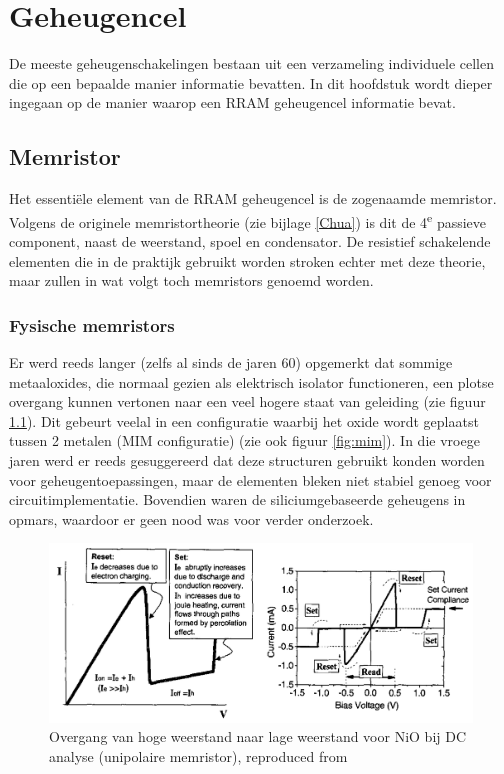 \chapter{Geheugencel}
\label{cell}
De meeste geheugenschakelingen bestaan uit een verzameling individuele cellen die op een bepaalde manier informatie bevatten.
In dit hoofdstuk wordt dieper ingegaan op de manier waarop een RRAM geheugencel informatie bevat.

\section{Memristor}
Het essentiële element van de RRAM geheugencel is de zogenaamde memristor.
Volgens de originele memristortheorie (zie bijlage \ref{Chua}) is dit de 4\textsuperscript{e} passieve component, naast de weerstand, spoel en condensator. De resistief schakelende elementen die in de praktijk gebruikt worden stroken echter met deze theorie, maar zullen in wat volgt toch memristors genoemd worden.

\subsection{Fysische memristors}
Er werd reeds langer (zelfs al sinds de jaren 60) opgemerkt dat sommige metaaloxides, die normaal gezien als elektrisch isolator functioneren, een plotse overgang kunnen vertonen naar een veel hogere staat van geleiding (zie figuur \ref{fig:i-v}). Dit gebeurt veelal in een configuratie waarbij het oxide wordt geplaatst tussen 2 metalen (MIM configuratie)\cite{Won12} (zie ook figuur \ref{fig:mim}). In die vroege jaren werd er reeds gesuggereerd dat deze structuren gebruikt konden worden voor geheugentoepassingen\cite{Sim67}, maar de elementen bleken niet stabiel genoeg voor circuitimplementatie. Bovendien waren de siliciumgebaseerde geheugens in opmars, waardoor er geen nood was voor verder onderzoek.

\begin{figure}[ht!]
  \centering
  \includegraphics[scale=0.20]{../fig/hfdstk-cel-I-V.png}
  \caption[Resistieve schakeling]{Overgang van hoge weerstand naar lage weerstand voor NiO bij DC analyse (unipolaire memristor), reproduced from\cite{Bae04}}
  \label{fig:i-v}
\end{figure}

